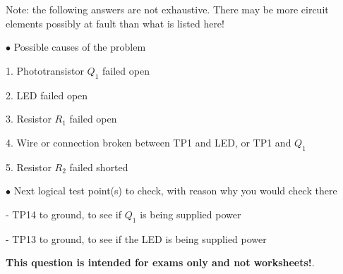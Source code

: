 
Note: the following answers are not exhaustive.  There may be more circuit elements possibly at fault than what is listed here!

\medskip
\goodbreak
\item{$\bullet$} Possible causes of the problem
\item{1.} Phototransistor $Q_1$ failed open
\item{2.} LED failed open
\item{3.} Resistor $R_1$ failed open
\item{4.} Wire or connection broken between TP1 and LED, or TP1 and $Q_1$
\item{5.} Resistor $R_2$ failed shorted
\medskip

\medskip
\goodbreak
\item{$\bullet$} Next logical test point(s) to check, with reason why you would check there
\item{-} TP14 to ground, to see if $Q_1$ is being supplied power
\item{-} TP13 to ground, to see if the LED is being supplied power
\medskip







{\bf This question is intended for exams only and not worksheets!}.




